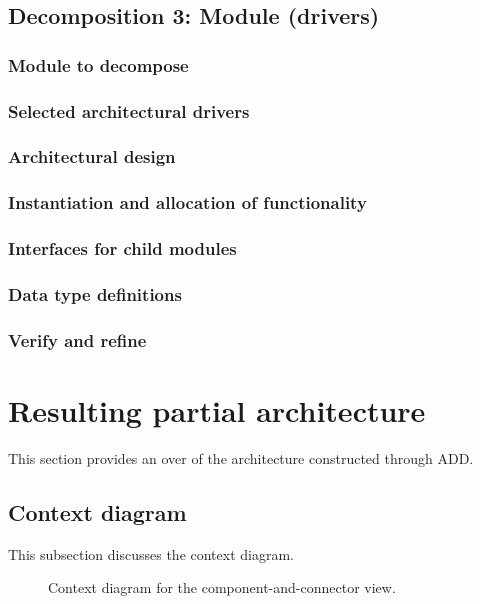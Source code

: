 \documentclass[a4paper,10pt]{article}
\begin{document}
\subsection{Decomposition 3: Module (drivers)}
\subsubsection{Module to decompose}
\subsubsection{Selected architectural drivers}
\subsubsection{Architectural design}
\subsubsection{Instantiation and allocation of functionality}
\subsubsection{Interfaces for child modules}
\subsubsection{Data type definitions}
\subsubsection{Verify and refine}

\section{Resulting partial architecture}\label{sec:architecture}
This section provides an over of the architecture constructed through ADD\@.

\subsection{Context diagram}
This subsection discusses the context diagram.

\begin{figure}[!htp]
    \centering
    \caption{Context diagram for the component-and-connector view.
        }\label{fig:cc_context}
\end{figure}
\end{document}
